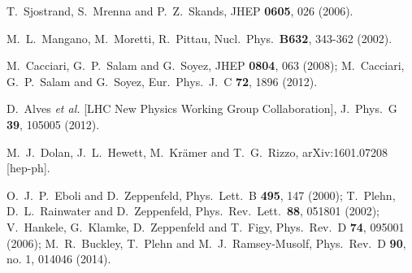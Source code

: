   T.~Sjostrand, S.~Mrenna and P.~Z.~Skands,
  JHEP {\bf 0605}, 026 (2006).

  M.~L.~Mangano, M.~Moretti, R.~Pittau,
  Nucl.\ Phys.\  {\bf B632}, 343-362 (2002).

  M.~Cacciari, G.~P.~Salam and G.~Soyez,
  JHEP {\bf 0804}, 063 (2008);
  M.~Cacciari, G.~P.~Salam and G.~Soyez,
  Eur.\ Phys.\ J.\ C {\bf 72}, 1896 (2012).

  D.~Alves {\it et al.} [LHC New Physics Working Group Collaboration],
  J.\ Phys.\ G {\bf 39}, 105005 (2012).

  M.~J.~Dolan, J.~L.~Hewett, M.~Kr\"{a}mer and T.~G.~Rizzo,
  arXiv:1601.07208 [hep-ph].

  O.~J.~P.~Eboli and D.~Zeppenfeld,
  Phys.\ Lett.\ B {\bf 495}, 147 (2000);
  T.~Plehn, D.~L.~Rainwater and D.~Zeppenfeld,
  Phys.\ Rev.\ Lett.\  {\bf 88}, 051801 (2002);
  V.~Hankele, G.~Klamke, D.~Zeppenfeld and T.~Figy,
  Phys.\ Rev.\ D {\bf 74}, 095001 (2006);
  M.~R.~Buckley, T.~Plehn and M.~J.~Ramsey-Musolf,
  Phys.\ Rev.\ D {\bf 90}, no. 1, 014046 (2014).

